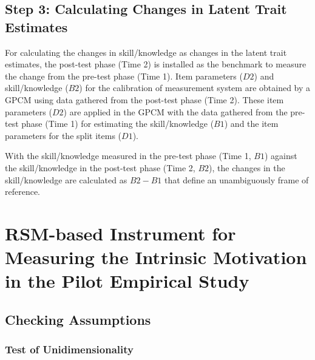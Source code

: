 \subsection{Step 3: Calculating Changes in Latent Trait Estimates}

For calculating the changes in skill/knowledge as changes in the latent trait estimates, the post-test phase (Time 2) is installed as the benchmark to measure the change from the pre-test phase (Time 1). Item parameters ($D2$) and skill/knowledge ($B2$) for the calibration of measurement system are obtained by a GPCM using data gathered from the post-test phase (Time 2). These item parameters ($D2$) are applied in the GPCM with the data gathered from the pre-test phase (Time 1) for estimating the skill/knowledge ($B1$) and the item parameters for the split items ($D1$).

With the skill/knowledge measured in the pre-test phase (Time 1, $B1$) against the skill/knowledge in the post-test phase (Time 2, $B2$), the changes in the skill/knowledge are calculated as $B2-B1$ that define an unambiguously frame of reference.


\section{RSM-based Instrument for Measuring the Intrinsic Motivation in the Pilot Empirical Study}
\label{sec:irt-motivation-pilot-study}

\subsection{Checking Assumptions}

\subsubsection*{Test of Unidimensionality}

